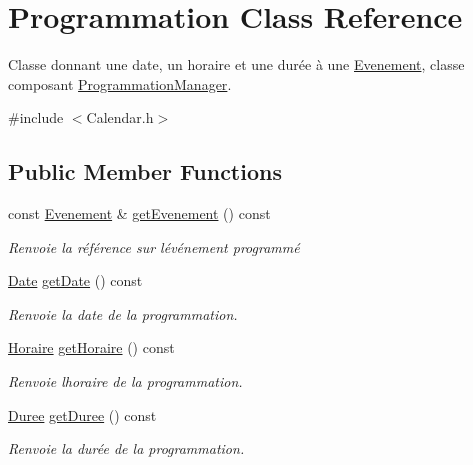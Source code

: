 \hypertarget{class_programmation}{}\section{Programmation Class Reference}
\label{class_programmation}


Classe donnant une date, un horaire et une durée à une \hyperlink{class_evenement}{Evenement}, classe composant \hyperlink{class_programmation_manager}{Programmation\+Manager}.  




{\ttfamily \#include $<$Calendar.\+h$>$}

\subsection*{Public Member Functions}
\begin{DoxyCompactItemize}
\item 
const \hyperlink{class_evenement}{Evenement} \& \hyperlink{class_programmation_ad206ec323cdb7dba4006b8915b1a165e}{get\+Evenement} () const 
\begin{DoxyCompactList}\small\item\em Renvoie la référence sur l\textquotesingle{}événement programmé \end{DoxyCompactList}\item 
\hyperlink{class_t_i_m_e_1_1_date}{Date} \hyperlink{class_programmation_abab51a44ecfa15becd790571d80074e8}{get\+Date} () const 
\begin{DoxyCompactList}\small\item\em Renvoie la date de la programmation. \end{DoxyCompactList}\item 
\hyperlink{class_t_i_m_e_1_1_horaire}{Horaire} \hyperlink{class_programmation_af4b33fc2e67826566fff3ba43f637c4f}{get\+Horaire} () const 
\begin{DoxyCompactList}\small\item\em Renvoie l\textquotesingle{}horaire de la programmation. \end{DoxyCompactList}\item 
\hyperlink{class_t_i_m_e_1_1_duree}{Duree} \hyperlink{class_programmation_a86e406352b60adb786c1dd5b8ae1888a}{get\+Duree} () const 
\begin{DoxyCompactList}\small\item\em Renvoie la durée de la programmation. \end{DoxyCompactList}\end{DoxyCompactItemize}
